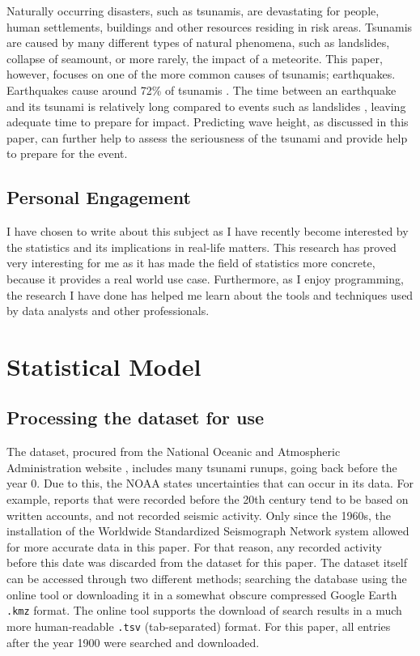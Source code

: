 \documentclass[11pt,letterpaper]{article}
\begin{document}
Naturally occurring disasters, such as tsunamis, are devastating for people, human settlements, buildings and other resources residing in risk areas. Tsunamis are caused by many different types of natural phenomena, such as landslides, collapse of seamount, or more rarely, the impact of a meteorite. This paper, however, focuses on one of the more common causes of tsunamis; earthquakes. Earthquakes cause around 72\% of tsunamis \cite{pacifictsunamimuseum}. The time between an earthquake and its tsunami is relatively long compared to events such as landslides \cite{sue_nokes_walters}, leaving adequate time to prepare for impact. Predicting wave height, as discussed in this paper, can further help to assess the seriousness of the tsunami and provide help to prepare for the event.

\subsection{Personal Engagement}

I have chosen to write about this subject as I have recently become interested by the statistics and its implications in real-life matters. This research has proved very interesting for me as it has made the field of statistics more concrete, because it provides a real world use case. Furthermore, as I enjoy programming, the research I have done has helped me learn about the tools and techniques used by data analysts and other professionals.

\section{Statistical Model}

\subsection{Processing the dataset for use}

The dataset, procured from the National Oceanic and Atmospheric Administration website \cite{noaa}, includes many tsunami runups, going back before the year 0. Due to this, the NOAA states uncertainties that can occur in its data. For example, reports that were recorded before the 20th century tend to be based on written accounts, and not recorded seismic activity. Only since the 1960s, the installation of the Worldwide Standardized Seismograph Network system allowed for more accurate data in this paper. For that reason, any recorded activity before this date was discarded from the dataset for this paper. The dataset itself can be accessed through two different methods; searching the database using the online tool or downloading it in a somewhat obscure compressed Google Earth \verb|.kmz| format. The online tool supports the download of search results in a much more human-readable \verb|.tsv| (tab-separated) format. For this paper, all entries after the year 1900 were searched and downloaded.
\end{document}
